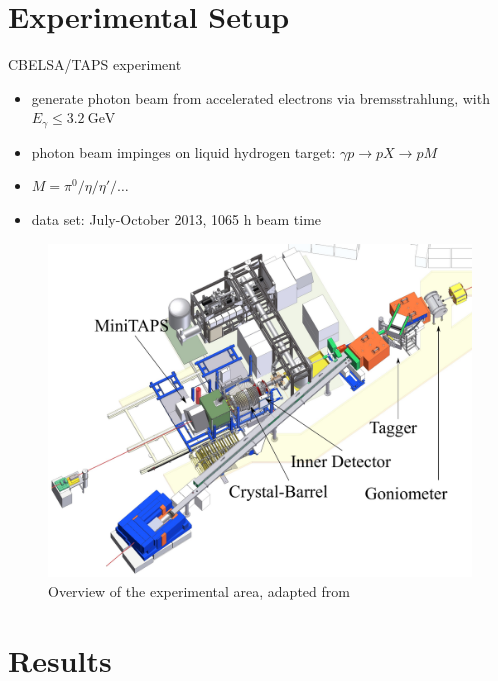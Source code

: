 \documentclass[11pt,aspectratio=169,dvipsnames]{beamer}
\begin{document}
	\section{Experimental Setup}
	\begin{frame}{CBELSA/TAPS experiment}
		\begin{minipage}{.3\linewidth}
			{\small
				\begin{itemize}
					\item generate photon beam from accelerated electrons via bremsstrahlung, with $E_\gamma\leq\SI{3.2}{\giga\eV}$ 
					\item photon beam impinges on liquid hydrogen target: $\gamma p \to p X\to p M$
					\item  $M=\pi^0/\eta/\eta'/\dots$
					\item data set: July-October 2013, 1065 h beam time
				\end{itemize}
			}
		\end{minipage}
		\begin{minipage}{.69\linewidth}
			\begin{figure}
				\centering
				\includegraphics[width=.9\linewidth]{CB-Area}
				\caption*{Overview of the experimental area, adapted from }
			\end{figure}
		\end{minipage}
		
	\end{frame}

	
	
	\section{Results}
\end{document}
